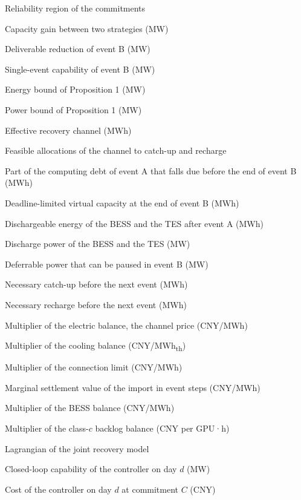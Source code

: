 \documentclass[a4paper,twocolumn,fleqn,10pt]{article}
\begin{document}
{\begin{nomlist}
\item[{\(\mathcal C_\rho\)}] Reliability region of the commitments
\item[{\(\Delta C_\rho\)}] Capacity gain between two strategies (MW)
\item[{\(\Gamma_B\)}] Deliverable reduction of event B (MW)
\item[{\(\Gamma^0_B\)}] Single-event capability of event B (MW)
\item[{\(\Gamma^E\)}] Energy bound of Proposition 1 (MW)
\item[{\(\Gamma^P\)}] Power bound of Proposition 1 (MW)
\item[{\(H^{eff}\)}] Effective recovery channel (MWh)
\item[{\(\mathcal H\)}] Feasible allocations of the channel to catch-up and recharge
\item[{\(X^{due}_A\)}] Part of the computing debt of event A that falls due before the end of event B (MWh)
\item[{\(\bar X_B\)}] Deadline-limited virtual capacity at the end of event B (MWh)
\item[{\(E_s\)}] Dischargeable energy of the BESS and the TES after event A (MWh)
\item[{\(P_s\)}] Discharge power of the BESS and the TES (MW)
\item[{\(p_f\)}] Deferrable power that can be paused in event B (MW)
\item[{\(c^*\)}] Necessary catch-up before the next event (MWh)
\item[{\(s^{req}\)}] Necessary recharge before the next event (MWh)
\item[{\(\lambda^{el}_t\)}] Multiplier of the electric balance, the channel price (CNY/MWh)
\item[{\(\chi_t\)}] Multiplier of the cooling balance (CNY/MWh\textsubscript{th})
\item[{\(\lambda^{cap}_t\)}] Multiplier of the connection limit (CNY/MWh)
\item[{\(\lambda^{ev}_t\)}] Marginal settlement value of the import in event steps (CNY/MWh)
\item[{\(\nu_t\)}] Multiplier of the BESS balance (CNY/MWh)
\item[{\(\mu_{c,t}\)}] Multiplier of the class-\(c\) backlog balance (CNY per GPU·h)
\item[{\(\mathcal L\)}] Lagrangian of the joint recovery model
\item[{\(\xi_d\)}] Closed-loop capability of the controller on day \(d\) (MW)
\item[{\(J_d(C)\)}] Cost of the controller on day \(d\) at commitment \(C\) (CNY)

\end{nomlist}}
\end{document}
